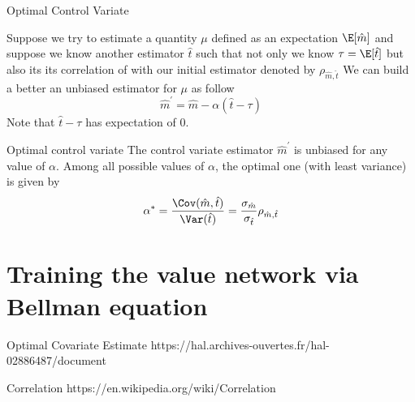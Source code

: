 Optimal Control Variate

Suppose we try to estimate a quantity $\mu$ defined as an expectation
$\E[\hat m]$ and suppose we know another estimator $\hat t$ such 
that not only we know $\tau = \E[\hat t]$ but also its its 
correlation of with our initial estimator denoted by $\rho_{\hat m, \hat t}$
We can build a better an unbiased estimator for $\mu$ as follow
\[
    \hat m ^{\prime} = \hat m - \alpha(\hat t - \tau)
\]
Note that $\hat t - \tau$ has expectation of 0. 

\begin{proposition}{Optimal control variate}
    The control variate estimator $\hat m ^{\prime}$ is unbiased for any
    value of $\alpha$. Among all possible values of $\alpha$, the optimal
    one (with least variance) is given by
    \[
        \alpha^* = \frac{\Cov(\hat m, \hat t)}{\Var(\hat t)} 
        = \frac{\sigma_{\hat m}}{\sigma_{\hat t}} \rho_{\hat m, \hat t}
    \]
\end{proposition}

\section{Training the value network via Bellman equation}



Optimal Covariate Estimate
https://hal.archives-ouvertes.fr/hal-02886487/document

Correlation
https://en.wikipedia.org/wiki/Correlation
